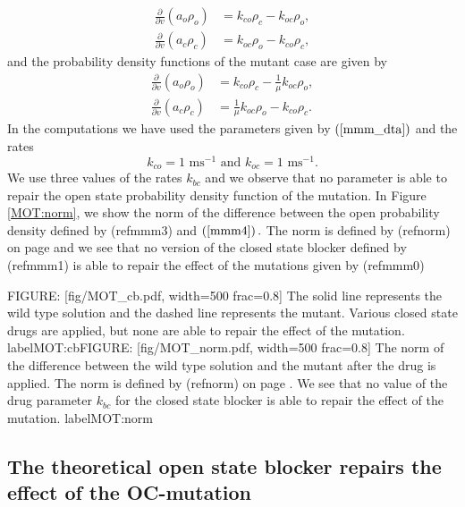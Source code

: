\begin{align}
\frac{\partial}{\partial v}\left(  a_{o}\rho_{o}\right)   &  =k_{co}\rho
_{c}-k_{oc}\rho_{o},\label{mmm4}\\
\frac{\partial}{\partial v}\left(  a_{c}\rho_{c}\right)   &  =k_{oc}\rho
_{o}-k_{co}\rho_{c},\nonumber
\end{align}
and the probability density functions of the mutant case are given by
\begin{align}
\frac{\partial}{\partial v}\left(  a_{o}\rho_{o}\right)   &  =k_{co}\rho
_{c}-\frac{1}{\mu}k_{oc}\rho_{o},\label{mutant44}\\
\frac{\partial}{\partial v}\left(  a_{c}\rho_{c}\right)   &  =\frac{1}{\mu}k_{oc}\rho
_{o}-k_{co}\rho_{c}.\nonumber
\end{align}
In the computations we have used the parameters given by $\left(
\ref{mmm_dta}\right)  $ and the rates
\[
k_{co}=1\text{ ms}^{-1} \text{ and }k_{oc}=1\text{ ms}^{-1}.
\]
We use three values of the rates $k_{bc}$ and we observe that no parameter is
able to repair the open state probability density function of the mutation. In
Figure \ref{MOT:norm}, we show the norm of the difference between the open probability
density defined by (ref{mmm3}) and $\left(  \ref{mmm4}
\right)  .$ The norm is defined by (ref{norm}) on page
\pageref{norm} and we see that no version of the closed state blocker defined 
by (ref{mmm1}) is able to repair the effect of the mutations
given by (ref{mmm0})

FIGURE: [fig/MOT_cb.pdf, width=500 frac=0.8] The solid line represents the wild type solution and the dashed line represents the mutant. Various closed state drugs are applied, but none are able to repair the effect of the mutation. label{MOT:cb}FIGURE: [fig/MOT_norm.pdf, width=500 frac=0.8] The norm of the difference between the wild type solution and the mutant after the drug is applied. 
The norm is defined by (ref{norm}) on page \pageref{norm}. We see that no value of the drug parameter 
$k_{bc}$ for the closed state blocker is able to repair the effect of the mutation.
 label{MOT:norm}
\subsection{The theoretical open state blocker repairs the effect of the OC-mutation}

